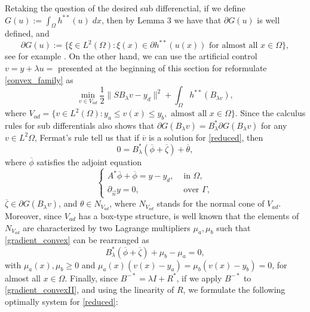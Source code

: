 \documentclass[11pt,a4paper]{amsart}
\newcommand{\om}{\Omega}
\newcommand{\norm}[1]{\lVert #1 \rVert}
\begin{document}
Retaking the question of the desired sub differenctial, if we define $G(u):=\int_{\Omega} h^{**}(u)\; dx$, then by Lemma 3 we have that $\partial G(u)$ is well defined, and
\begin{equation}\label{subdiff_biconjugate}
    \partial G(u):=\{\xi\in L^2(\om): \xi(x)\in \partial h^{**}(u(x)) \mbox{ for almost all }x\in \om \},
\end{equation}
see for example \cite{valkonen}. On the other hand, we can use the artificial control $v=y+\lambda u=$ presented at the beginning of this section for reformulate \eqref{convex_family} as
\begin{equation}\label{reduced}
    \min_{v\in V_{ad}}\frac{1}{2}\norm{SB_{\lambda}v-y_d}^2+\int_{\om}h^{**}(B_{\lambda v}),
\end{equation}
where $V_{ad}=\{v\in L^2(\om): y_a\le v(x)\le y_b, \mbox{ almost all }x\in \om\}$. Since the calculus rules for sub differentials also shows that $\partial G(B_{\lambda}v)=B_{\lambda}^*\partial G(B_{\lambda}v)$ for any $v\in L^{2}\Omega$, Fermat's rule tell us that if $\overline{v}$ is a solution for \eqref{reduced}, then 
\begin{equation}\label{gradient_convex}
0=B^*_{\lambda}(\overline{\phi}+\overline{\zeta})+\overline{\theta},
\end{equation}
where $\overline{\phi}$ satisfies the adjoint equation
\[
\begin{cases}
A^*\overline{\phi}+\overline{\phi}=y-y_d, &\mbox{ in }\Omega,\\
\partial_{\vec{n}}y=0, &\mbox{ over }\Gamma,
\end{cases}
\]
$\overline{\zeta}\in \partial G(B_{\lambda}v)$, and $\theta\in N_{V_{ad}}$, where $N_{V_{ad}}$ stands for the normal cone of $V_{ad}$. Moreover, since $V_{ad}$ has a box-type structure, is well known that the elements of $N_{V_{ad}}$ are characterized by two Lagrange multipliers $\mu_a, \mu_b$ such that \eqref{gradient_convex} can be rearranged as
\begin{equation}\label{gradient_convexII}
B^*_{\lambda}(\overline{\phi}+\overline{\zeta})+\mu_{b}-\mu_a=0,
\end{equation}
with $\mu_a(x), \mu_b\ge 0$ and $\mu_a(x)(v(x)-y_a)=\mu_b(v(x)-y_b)=0$, for almost all $x\in \Omega$. Finally, since $B^{-*}=\lambda I+R^*$, if we apply $B^{-*}$ to \eqref{gradient_convexII}, and using the linearity of $R$, we formulate the following optimally system for \eqref{reduced}:
\end{document}
